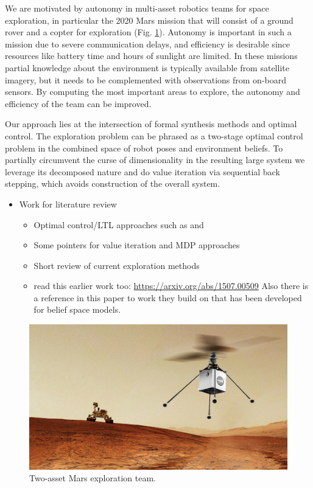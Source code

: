 \documentclass[conference]{IEEEtran}
\begin{document}
We are motivated by autonomy in multi-asset robotics teams for space exploration, in particular the 2020 Mars mission that will consist of a ground rover and a copter for exploration (Fig. \ref{fig:heli-rover}). Autonomy is important in such a mission due to severe communication delays, and efficiency is desirable since resources like battery time and hours of sunlight are limited. In these missions partial knowledge about the environment is typically available from satellite imagery, but it needs to be complemented with observations from on-board sensors. By computing the most important areas to explore, the autonomy and efficiency of the team can be improved. 

Our approach lies at the intersection of formal synthesis methods and optimal control. The exploration problem can be phrased as a two-stage optimal control problem in the combined space of robot poses and environment beliefs. To partially circumvent the curse of dimensionality in the resulting large system we leverage its decomposed nature and do value iteration via sequential back stepping, which avoids construction of the overall system. 

\begin{itemize}
  \item Work for literature review
  \begin{itemize}
    \item Optimal control/LTL approaches such as \cite{Papusha2016} and \cite{Alora2016}
    \item Some pointers for value iteration and MDP approaches
    \item Short review of current exploration methods
    \item read this earlier work too: \url{https://arxiv.org/abs/1507.00509} Also there is a reference in this paper to work they build on that has been developed for belief space models.
  \end{itemize}
\end{itemize}

\begin{figure}
  \begin{center}
    \includegraphics[width=0.8\columnwidth]{figs/heli-rover.png}
  \end{center}
  \caption{Two-asset Mars exploration team.}
  \label{fig:heli-rover}
\end{figure}
\end{document}
